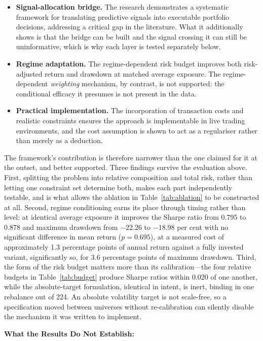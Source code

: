 \documentclass{singlecol-new}
\theoremstyle{TH}{
\newtheorem{lemma}{Lemma}
\newtheorem{theorem}[lemma]{Theorem}
\newtheorem{corrolary}[lemma]{Corrolary}
\newtheorem{conjecture}[lemma]{Conjecture}
\newtheorem{proposition}[lemma]{Proposition}
\newtheorem{claim}[lemma]{Claim}
\newtheorem{stheorem}[lemma]{Wrong Theorem}
\newtheorem{algorithm}{Algorithm}
}
\theoremstyle{THrm}{
\newtheorem{definition}{Definition}[section]
\newtheorem{question}{Question}[section]
\newtheorem{remark}{Remark}
\newtheorem{scheme}{Scheme}
}
\theoremstyle{THhit}{
\newtheorem{case}{Case}[section]
}
\begin{document}
\begin{itemize}
\item \textbf{Signal-allocation bridge.} The research demonstrates a systematic framework
for translating predictive signals into executable portfolio decisions, addressing a
critical gap in the literature. What it additionally shows is that the bridge can be built
and the signal crossing it can still be uninformative, which is why each layer is tested
separately below.
\item \textbf{Regime adaptation.} The regime-dependent risk budget improves both
risk-adjusted return and drawdown at matched average exposure. The regime-dependent
\emph{weighting} mechanism, by contrast, is not supported: the conditional efficacy it
presumes is not present in the data.
\item \textbf{Practical implementation.} The incorporation of transaction costs and
realistic constraints ensures the approach is implementable in live trading environments,
and the cost assumption is shown to act as a regulariser rather than merely as a
deduction.
\end{itemize}

The framework's contribution is therefore narrower than the one claimed for it at the
outset, and better supported. Three findings survive the evaluation above. First,
splitting the problem into relative composition and total risk, rather than letting one
constraint set determine both, makes each part independently testable, and is what allows
the ablation in Table~\ref{tab:ablation} to be constructed at all. Second, regime
conditioning earns its place through timing rather than level: at identical average
exposure it improves the Sharpe ratio from 0.795 to 0.878 and maximum drawdown from
$-22.26$ to $-18.98$ per cent with no significant difference in mean return
($p = 0.695$), at a measured cost of approximately 1.3 percentage points of annual return
against a fully invested variant, significantly so, for 3.6 percentage points of maximum
drawdown. Third, the form of the risk budget matters more than its calibration---the four
relative budgets in Table~\ref{tab:budget} produce Sharpe ratios within 0.020 of one
another, while the absolute-target formulation, identical in intent, is inert, binding in
one rebalance out of 224. An absolute volatility target is not scale-free, so a
specification moved between universes without re-calibration can silently disable the
mechanism it was written to implement.

\textbf{What the Results Do Not Establish:}
\end{document}
